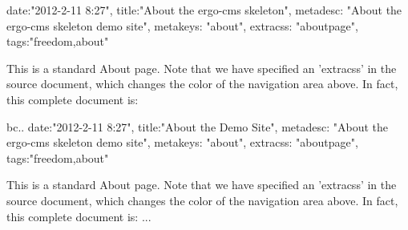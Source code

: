 {
date:"2012-2-11 8:27",
title:"About the ergo-cms skeleton",
metadesc: "About the ergo-cms skeleton demo site",
metakeys: "about",
extracss: "aboutpage",
tags:"freedom,about"
}

This is a standard About page. Note that we have specified an 'extracss' in the source document, which changes the color of the navigation area above. In fact, this complete document is:

bc.. {
date:"2012-2-11 8:27",
title:"About the Demo Site",
metadesc: "About the ergo-cms skeleton demo site",
metakeys: "about",
extracss: "aboutpage",
tags:"freedom,about"
}

This is a standard About page. Note that we have specified an 'extracss' in the source document, which changes the color of the navigation area above. In fact, this complete document is: ...
